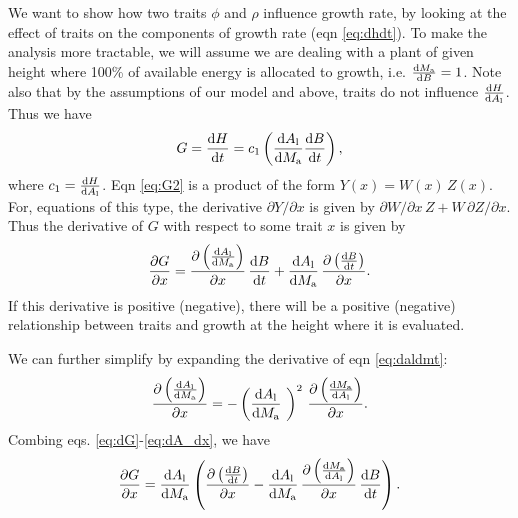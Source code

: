 \documentclass[a4paper,11pt]{article}
\begin{document}
We want to show how two traits $\phi$ and $\rho$ influence growth rate,
by looking at the effect of
traits on the components of growth rate (eqn \ref{eq:dhdt}). To make
the analysis more tractable, we will assume we are dealing with a plant of
given height where 100\% of available energy is allocated to growth,
i.e. $\frac{{\rm d}M_{\rm a}}{{\rm d}B}=1$. Note also
that by the assumptions of our model and above, traits do not influence
$\frac{{\rm d}H} {{\rm d}A_{\rm l}}$. Thus we have
\begin{equation} \label{eq:G2}
G = \frac{{\rm d}H}{{\rm d}t} = c_1   \left(\frac{{\rm d}A_{\rm l}} {{\rm d}M_{\rm a}}  \frac{ {\rm d}B} {{\rm d}t} \right),
\end{equation}
where $c_1 = \frac{{\rm d}H}{{\rm d}A_{\rm l}}$. Eqn
\ref{eq:G2} is a product of the form $Y(x) = W(x) \, Z(x)$. For,
equations of this type, the derivative $\partial{Y}/\partial{x}$ is
given by $\partial{W}/\partial{x} \, Z + W \, \partial{Z}/\partial{x}$. Thus
the derivative of $G$ with respect to some trait $x$  is given by
\begin{equation} \label{eq:dG}
\frac{\partial G} {\partial x} =
\frac{\partial \left(\frac{{\rm d}A_{\rm l}} {{\rm d}M_{\rm a}}\right)}{\partial x}
 \, \frac{ {\rm d}B} {{\rm d}t}
+ \frac{{\rm d}A_{\rm l}} {{\rm d}M_{\rm a}}
\, \frac{\partial \left( \frac{ {\rm d}B} {{\rm d}t}\right)}{\partial x}.
\end{equation}
If this derivative is positive (negative), there will be a positive (negative) relationship
between traits and growth at the height where it is evaluated.

We can further simplify by expanding the derivative of eqn \ref{eq:daldmt}:
\begin{equation} \label{eq:dA_dx}
\frac{\partial \left(\frac{{\rm d}A_{\rm l}} {{\rm d}M_{\rm a}}\right)}
{\partial x} = -\left(\frac{{\rm d}A_{\rm l}} {{\rm d}M_{\rm a}}\ \right)^2
\, \frac{\partial \left(\frac{{\rm d}M_{\rm a}} {{\rm d}A_{\rm l}}\right)
}{\partial x}.
\end{equation}
Combing eqs. \ref{eq:dG}-\ref{eq:dA_dx}, we have
\begin{equation} \label{eq:dG2}
\frac{\partial G} {\partial x} =
\frac{{\rm d}A_{\rm l}} {{\rm d}M_{\rm a}}
\left(
\frac{\partial \left( \frac{ {\rm d}B} {{\rm d}t}\right)}{\partial x}
- \frac{{\rm d}A_{\rm l}} {{\rm d}M_{\rm a}}
\,  \frac{\partial \left(\frac{{\rm d}M_{\rm a}} {{\rm d}A_{\rm l}}\right)
}{\partial x}
 \, \frac{ {\rm d}B} {{\rm d}t}
\right).
\end{equation}
\end{document}
